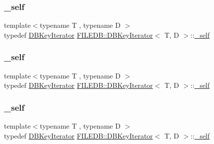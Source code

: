 \subsubsection{\texorpdfstring{\_self}{\_self}\hspace{0.1cm}{\footnotesize\ttfamily [1/3]}}
{\footnotesize\ttfamily template$<$typename T , typename D $>$ \\
typedef \mbox{\hyperlink{classFILEDB_1_1DBKeyIterator}{D\+B\+Key\+Iterator}} \mbox{\hyperlink{classFILEDB_1_1DBKeyIterator}{F\+I\+L\+E\+D\+B\+::\+D\+B\+Key\+Iterator}}$<$ T, D $>$\+::\mbox{\hyperlink{classFILEDB_1_1DBKeyIterator_aaf7773c7a848ec6e04bc738dd794ace1}{\+\_\+self}}}

\mbox{\label{classFILEDB_1_1DBKeyIterator_aaf7773c7a848ec6e04bc738dd794ace1}} 
\subsubsection{\texorpdfstring{\_self}{\_self}\hspace{0.1cm}{\footnotesize\ttfamily [2/3]}}
{\footnotesize\ttfamily template$<$typename T , typename D $>$ \\
typedef \mbox{\hyperlink{classFILEDB_1_1DBKeyIterator}{D\+B\+Key\+Iterator}} \mbox{\hyperlink{classFILEDB_1_1DBKeyIterator}{F\+I\+L\+E\+D\+B\+::\+D\+B\+Key\+Iterator}}$<$ T, D $>$\+::\mbox{\hyperlink{classFILEDB_1_1DBKeyIterator_aaf7773c7a848ec6e04bc738dd794ace1}{\+\_\+self}}}

\mbox{\label{classFILEDB_1_1DBKeyIterator_aaf7773c7a848ec6e04bc738dd794ace1}} 
\subsubsection{\texorpdfstring{\_self}{\_self}\hspace{0.1cm}{\footnotesize\ttfamily [3/3]}}
{\footnotesize\ttfamily template$<$typename T , typename D $>$ \\
typedef \mbox{\hyperlink{classFILEDB_1_1DBKeyIterator}{D\+B\+Key\+Iterator}} \mbox{\hyperlink{classFILEDB_1_1DBKeyIterator}{F\+I\+L\+E\+D\+B\+::\+D\+B\+Key\+Iterator}}$<$ T, D $>$\+::\mbox{\hyperlink{classFILEDB_1_1DBKeyIterator_aaf7773c7a848ec6e04bc738dd794ace1}{\+\_\+self}}}



